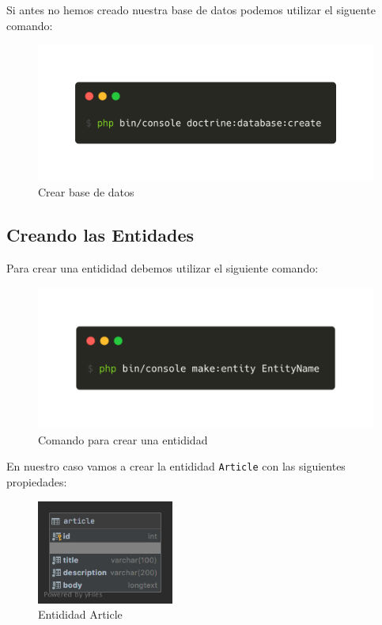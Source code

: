 Si antes no hemos creado nuestra base de datos podemos utilizar el siguente comando:
\begin{figure}[ht]
  \centering
  \includegraphics[width=\textwidth]{../assets/create_db.png}
  \caption{Crear base de datos}
  \label{fig:create_db}
\end{figure}
\clearpage
\subsection{Creando las Entidades}

Para crear una entididad debemos utilizar el siguiente comando:

\begin{figure}[ht]
  \centering
  \includegraphics[width=\textwidth]{../assets/make_entity.png}
  \caption{Comando para crear una entididad}
  \label{fig:make_entity}
\end{figure}

En nuestro caso vamos a crear la entididad \texttt{Article} con las siguientes propiedades:

\begin{figure}[ht]
  \centering
  \includegraphics[width=0.4\textwidth]{../assets/article_sql.png}
  \caption{Entididad Article}
  \label{fig:article_sql}
\end{figure}

